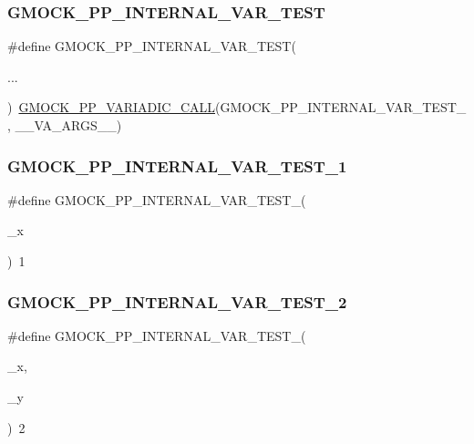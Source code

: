 \subsubsection{\texorpdfstring{GMOCK\_PP\_INTERNAL\_VAR\_TEST}{GMOCK\_PP\_INTERNAL\_VAR\_TEST}}
{\footnotesize\ttfamily \#define G\+M\+O\+C\+K\+\_\+\+P\+P\+\_\+\+I\+N\+T\+E\+R\+N\+A\+L\+\_\+\+V\+A\+R\+\_\+\+T\+E\+ST(\begin{DoxyParamCaption}\item[{}]{... }\end{DoxyParamCaption})~\mbox{\hyperlink{_obj__test_2lib_2googletest-master_2googlemock_2include_2gmock_2internal_2gmock-pp_8h_a4dd8715f753c7c3957f7185acf609e55}{G\+M\+O\+C\+K\+\_\+\+P\+P\+\_\+\+V\+A\+R\+I\+A\+D\+I\+C\+\_\+\+C\+A\+LL}}(G\+M\+O\+C\+K\+\_\+\+P\+P\+\_\+\+I\+N\+T\+E\+R\+N\+A\+L\+\_\+\+V\+A\+R\+\_\+\+T\+E\+S\+T\+\_\+, \+\_\+\+\_\+\+V\+A\+\_\+\+A\+R\+G\+S\+\_\+\+\_\+)}

\mbox{\label{googletest-master_2googlemock_2test_2gmock-pp__test_8cc_af50bdb0dbcdac1eede87e5b261aef933}} 
\subsubsection{\texorpdfstring{GMOCK\_PP\_INTERNAL\_VAR\_TEST\_1}{GMOCK\_PP\_INTERNAL\_VAR\_TEST\_1}}
{\footnotesize\ttfamily \#define G\+M\+O\+C\+K\+\_\+\+P\+P\+\_\+\+I\+N\+T\+E\+R\+N\+A\+L\+\_\+\+V\+A\+R\+\_\+\+T\+E\+S\+T\+\_(\begin{DoxyParamCaption}\item[{}]{\+\_\+x }\end{DoxyParamCaption})~1}

\mbox{\label{googletest-master_2googlemock_2test_2gmock-pp__test_8cc_afad491ad91c52f7f8bad4ccd3448ce5b}} 
\subsubsection{\texorpdfstring{GMOCK\_PP\_INTERNAL\_VAR\_TEST\_2}{GMOCK\_PP\_INTERNAL\_VAR\_TEST\_2}}
{\footnotesize\ttfamily \#define G\+M\+O\+C\+K\+\_\+\+P\+P\+\_\+\+I\+N\+T\+E\+R\+N\+A\+L\+\_\+\+V\+A\+R\+\_\+\+T\+E\+S\+T\+\_(\begin{DoxyParamCaption}\item[{}]{\+\_\+x,  }\item[{}]{\+\_\+y }\end{DoxyParamCaption})~2}

